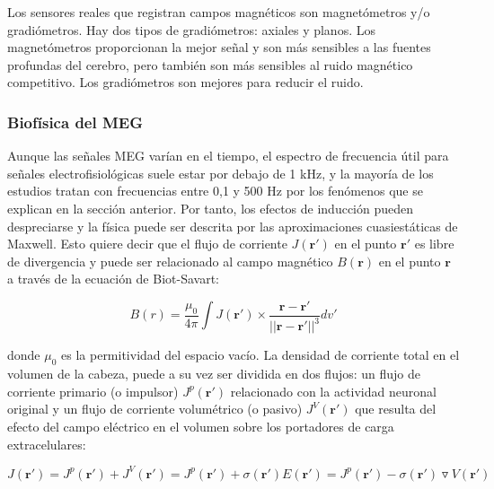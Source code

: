 \documentclass[11pt,letterpaper]{article}
\numberwithin{equation}{subsection}
\numberwithin{table}{subsection}
\begin{document}
\bigskip
\noindent Los sensores reales que registran campos magnéticos son magnetómetros y/o gradiómetros. Hay dos tipos de gradiómetros: axiales y planos. Los magnetómetros proporcionan la mejor señal y son más sensibles a las fuentes profundas del cerebro, pero también son más sensibles al ruido magnético competitivo. Los gradiómetros son mejores para reducir el ruido.



\subsubsection*{Biofísica del MEG}

\smallskip
\noindent Aunque las señales MEG varían en el tiempo, el espectro de frecuencia útil para señales electrofisiológicas  suele estar por debajo de 1 kHz, y la mayoría de los estudios tratan con frecuencias entre 0,1 y 500 Hz por los fenómenos que se explican en la sección anterior. Por tanto, los efectos de inducción pueden despreciarse y la física puede ser descrita por las aproximaciones cuasiestáticas de Maxwell. Esto quiere decir que el flujo de corriente $J(\mathbf{r}')$ en el punto $\mathbf{r}'$ es libre de divergencia y puede ser relacionado al campo magnético $B(\mathbf{r})$ en el punto $\mathbf{r}$ a través de la ecuación de Biot-Savart: 

\begin{equation}
B(r) = \frac{\mu_0}{4\pi} \int J(\mathbf{r}') \times \frac{\mathbf{r}-\textbf{r}'}{||\mathbf{r}-\mathbf{r}'|| ^3} dv'
\end{equation}

\smallskip
\noindent donde $\mu_0$ es la permitividad del espacio vacío. La densidad de corriente total en el volumen de la cabeza, puede a su vez ser dividida en dos flujos: un flujo de corriente primario (o impulsor) $J^p(\mathbf{r}')$ relacionado con la actividad neuronal original y un flujo de corriente volumétrico (o pasivo) $J^V(\mathbf{r}')$ que resulta del efecto del campo eléctrico en el volumen sobre los portadores de carga extracelulares:

\begin{equation}
J(\mathbf{r}') = J^p(\mathbf{r}') + J^V(\mathbf{r}') = J^p(\mathbf{r}') + \sigma(\mathbf{r}')E(\mathbf{r}') = J^p(\mathbf{r}')-\sigma(\mathbf{r}')\triangledown V(\mathbf{r}')
\end{equation}
\end{document}
